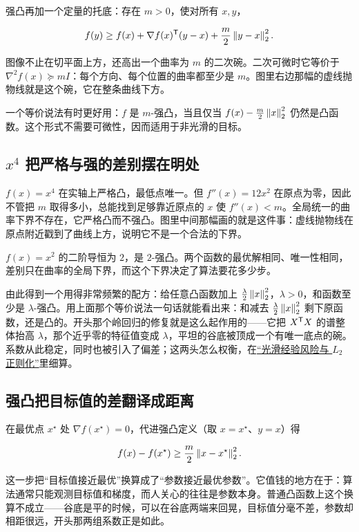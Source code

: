 强凸再加一个定量的托底：存在 \(m>0\)，使对所有 \(x,y\)，

\[
f(y)\ge f(x)+\nabla f(x)^{\mathsf{T}}(y-x)+\frac m2\left\lVert y-x\right\rVert_2^2.
\]

图像不止在切平面上方，还高出一个曲率为 \(m\) 的二次碗。二次可微时它等价于 \(\nabla^2f(x)\succeq mI\)：每个方向、每个位置的曲率都至少是 \(m\)。图里右边那幅的虚线抛物线就是这个碗，它在整条曲线下方。

一个等价说法有时更好用：\(f\) 是 \(m\)-强凸，当且仅当 \(f(x)-\frac m2\left\lVert x\right\rVert_2^2\) 仍然是凸函数。这个形式不需要可微性，因而适用于非光滑的目标。

\subsection{\texorpdfstring{\(x^4\) 把严格与强的差别摆在明处}{x^4 把严格与强的差别摆在明处}}

\(f(x)=x^4\) 在实轴上严格凸，最低点唯一。但 \(f''(x)=12x^2\) 在原点为零，因此不管把 \(m\) 取得多小，总能找到足够靠近原点的 \(x\) 使 \(f''(x)<m\)。全局统一的曲率下界不存在，它严格凸而不强凸。图里中间那幅画的就是这件事：虚线抛物线在原点附近戳到了曲线上方，说明它不是一个合法的下界。

\(f(x)=x^2\) 的二阶导恒为 \(2\)，是 \(2\)-强凸。两个函数的最优解相同、唯一性相同，差别只在曲率的全局下界，而这个下界决定了算法要花多少步。

由此得到一个用得非常频繁的配方：给任意凸函数加上 \(\frac\lambda2\left\lVert x\right\rVert_2^2\)，\(\lambda>0\)，和函数至少是 \(\lambda\)-强凸。用上面那个等价说法一句话就能看出来：和减去 \(\frac\lambda2\left\lVert x\right\rVert_2^2\) 剩下原函数，还是凸的。开头那个岭回归的修复就是这么起作用的——它把 \(X^{\mathsf{T}}X\) 的谱整体抬高 \(\lambda\)，那个近乎零的特征值变成 \(\lambda\)，平坦的谷底被顶成一个有唯一底点的碗。系数从此稳定，同时也被引入了偏差；这两头怎么权衡，在\hyperref[sec:09-Convex-Optimization/07-Applications/01]{``光滑经验风险与 \(L_2\) 正则化''}里细算。

\subsection{强凸把目标值的差翻译成距离}

在最优点 \(x^\star\) 处 \(\nabla f(x^\star)=0\)，代进强凸定义（取 \(x=x^\star\)、\(y=x\)）得

\[
f(x)-f(x^\star)\ge\frac m2\left\lVert x-x^\star\right\rVert_2^2.
\]

这一步把``目标值接近最优''换算成了``参数接近最优参数''。它值钱的地方在于：算法通常只能观测目标值和梯度，而人关心的往往是参数本身。普通凸函数上这个换算不成立——谷底是平的时候，可以在谷底两端来回晃，目标值分毫不差，参数却相距很远，开头那两组系数正是如此。

